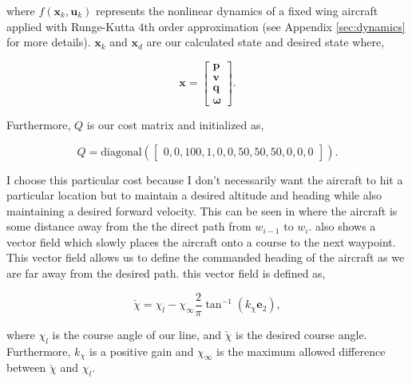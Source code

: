\documentclass{article}
\begin{document}
where $f(\mathbf{x}_k,\mathbf{u}_k)$ represents the nonlinear dynamics of a fixed wing aircraft applied with Runge-Kutta 4th order approximation (see Appendix \ref{sec:dynamics} for more details). $\mathbf{x}_k$ and $\mathbf{x}_{d}$ are our calculated state and desired state where,

\begin{equation}
\label{eq:lqr_current_desired_states}
\mathbf{x}=\begin{bmatrix}\mathbf{p} \\ \mathbf{v} \\ \mathbf{q} \\ \boldsymbol{\omega}\end{bmatrix}.
\end{equation}

Furthermore, $Q$ is our cost matrix and initialized as,

\begin{equation}
Q = \text{diagonal}(\begin{bmatrix}
	0,0,100,1,0,0,50,50,50,0,0,0
\end{bmatrix}).
\end{equation}

I choose this particular cost because I don't necessarily want the aircraft to hit a particular location but to maintain a desired altitude and heading while also maintaining a desired forward velocity. This can be seen in  where the aircraft is some distance away from the the direct path from $w_{i-1}$ to $w_i$.  also shows a vector field which slowly places the aircraft onto a course to the next waypoint. This vector field allows us to define the commanded heading of the aircraft as we are far away from the desired path. this vector field is defined as,

\begin{equation}
\check{\chi}=\chi_{l}-\chi_{\infty}\frac{2}{\pi}\tan^{-1}\left(k_{\chi}\mathbf{e}_{2}\right),
\end{equation}

where $\chi_l$ is the course angle of our line, and $\check{\chi}$ is the desired course angle. Furthermore, $k_\chi$ is a positive gain and $\chi_\infty$ is the maximum allowed difference between $\check{\chi}$ and $\chi_l$.

\end{document}
